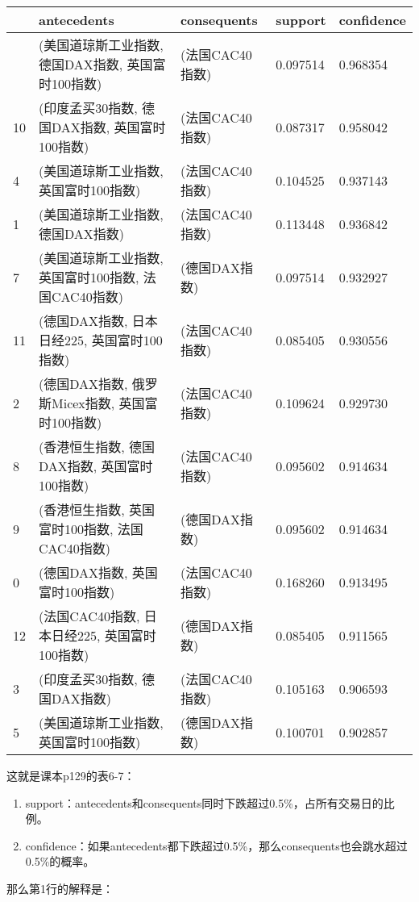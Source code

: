 \documentclass[
  letterpaper,
  DIV=11,
  numbers=noendperiod]{scrreprt}
\providecommand{\tightlist}{%
  \setlength{\itemsep}{0pt}\setlength{\parskip}{0pt}}\usepackage{longtable,booktabs,array}
\begin{document}
\begin{longtable}[]{@{}lllll@{}}
\toprule\noalign{}
& antecedents & consequents & support & confidence \\
\midrule\noalign{}
\endhead
\bottomrule\noalign{}
\endlastfoot
6 & (美国道琼斯工业指数, 德国DAX指数, 英国富时100指数) & (法国CAC40指数)
& 0.097514 & 0.968354 \\
10 & (印度孟买30指数, 德国DAX指数, 英国富时100指数) & (法国CAC40指数) &
0.087317 & 0.958042 \\
4 & (美国道琼斯工业指数, 英国富时100指数) & (法国CAC40指数) & 0.104525 &
0.937143 \\
1 & (美国道琼斯工业指数, 德国DAX指数) & (法国CAC40指数) & 0.113448 &
0.936842 \\
7 & (美国道琼斯工业指数, 英国富时100指数, 法国CAC40指数) & (德国DAX指数)
& 0.097514 & 0.932927 \\
11 & (德国DAX指数, 日本日经225, 英国富时100指数) & (法国CAC40指数) &
0.085405 & 0.930556 \\
2 & (德国DAX指数, 俄罗斯Micex指数, 英国富时100指数) & (法国CAC40指数) &
0.109624 & 0.929730 \\
8 & (香港恒生指数, 德国DAX指数, 英国富时100指数) & (法国CAC40指数) &
0.095602 & 0.914634 \\
9 & (香港恒生指数, 英国富时100指数, 法国CAC40指数) & (德国DAX指数) &
0.095602 & 0.914634 \\
0 & (德国DAX指数, 英国富时100指数) & (法国CAC40指数) & 0.168260 &
0.913495 \\
12 & (法国CAC40指数, 日本日经225, 英国富时100指数) & (德国DAX指数) &
0.085405 & 0.911565 \\
3 & (印度孟买30指数, 德国DAX指数) & (法国CAC40指数) & 0.105163 &
0.906593 \\
5 & (美国道琼斯工业指数, 英国富时100指数) & (德国DAX指数) & 0.100701 &
0.902857 \\
\end{longtable}

这就是课本p129的表6-7：

\begin{enumerate}
\def\labelenumi{\arabic{enumi}.}
\tightlist
\item
  support：antecedents和consequents同时下跌超过0.5\%，占所有交易日的比例。
\item
  confidence：如果antecedents都下跌超过0.5\%，那么consequents也会跳水超过0.5\%的概率。
\end{enumerate}

那么第1行的解释是：
\end{document}
